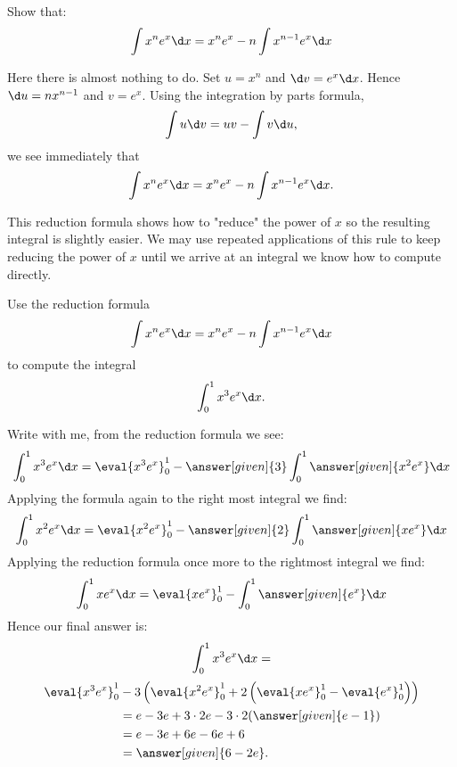 \documentclass{ximera}
\begin{document}
\begin{example}
  Show that:
  \[
  \int x^n e^x \d x = x^n e^x -n \int x^{n-1} e^x\d x
  \]
  \begin{explanation}
    Here there is almost nothing to do. Set $u= x^n$ and $\d v =
    e^x \d x$. Hence $\d u = n x^{n-1}$ and $v = e^x$. Using the
    integration by parts formula,
    \[
    \int u\d v = uv-\int v\d u,
    \]
    we see immediately that
    \[
    \int x^n e^x \d x = x^n e^x -n \int x^{n-1} e^x \d x.
    \]
  \end{explanation}
\end{example}

This reduction formula shows how to "reduce" the power of $x$ so the resulting integral is slightly easier. We may use repeated applications of this rule to keep reducing the power of $x$ until we arrive at an integral we know how to compute directly. 

\begin{example}
  Use the reduction formula
  \[
  \int x^n e^x \d x = x^n e^x -n \int x^{n-1} e^x\d x
  \]
  to compute the integral
  \[
  \int_0^1 x^3 e^x \d x.
  \]
  \begin{explanation}
    Write with me, from the reduction formula we see:
    \[
    \int_0^1 x^3 e^x \d x = \eval{x^3e^x}_0^1 - \answer[given]{3}\int_0^1 \answer[given]{x^{2} e^x}\d x
    \]
    Applying the formula again to the right most integral we find:
    \[
    \int_0^1 x^{2} e^x\d x = \eval{x^2e^x}_0^1 - \answer[given]{2}\int_0^1 \answer[given]{x e^x}\d x
    \]
    Applying the reduction formula once more to the rightmost integral we find:
    \[
    \int_0^1 x e^x\d x = \eval{xe^x}_0^1 - \int_0^1 \answer[given]{e^x}\d x
    \]
    Hence our final answer is:
    \[
    \int_0^1 x^3 e^x \d x =
    \]
    \begin{align*}
      \eval{x^3e^x}_0^1 &- 3\left(\eval{x^2e^x}_0^1 +  2\left(\eval{xe^x}_0^1 -\eval{e^x}_0^1\right)\right)\\
      &= e - 3e + 3\cdot 2 e -3\cdot 2(\answer[given]{e-1})\\
      &= e-3e+6e-6e+6\\
      &=\answer[given]{6-2e}.
    \end{align*}
  \end{explanation}
\end{example}

\end{document}
